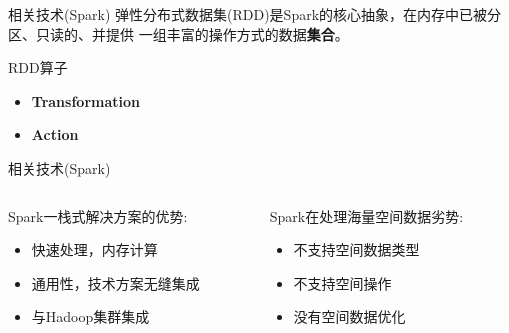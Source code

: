 \begin{frame}[t]{相关技术(Spark)}
    弹性分布式数据集(RDD)是Spark的核心抽象，在内存中已被分区、只读的、并提供
    一组丰富的操作方式的数据\textbf{集合}。

    \vspace{2em}
    \pause
    \alert{RDD算子}
    \begin{itemize}
        \item \textbf{Transformation} 
        \item \textbf{Action}
    \end{itemize}

\end{frame}

\begin{frame}[c]{相关技术(Spark)}
    \begin{columns}
        \begin{column}{0.5 \textwidth}
            Spark一栈式解决方案的\alert{优势:}
            
            \vspace{0.5em}
            \begin{itemize}
                \item 快速处理，内存计算
                \item 通用性，技术方案无缝集成
                \item 与Hadoop集群集成
            \end{itemize}
        \end{column}

        \pause
        \begin{column}{0.5 \textwidth}
            Spark在处理海量空间数据\alert{劣势:}

            \vspace{0.5em}
            \begin{itemize}
                \item 不支持空间数据类型
                \item 不支持空间操作
                \item 没有空间数据优化
            \end{itemize}
        \end{column}
    \end{columns}

\end{frame}


